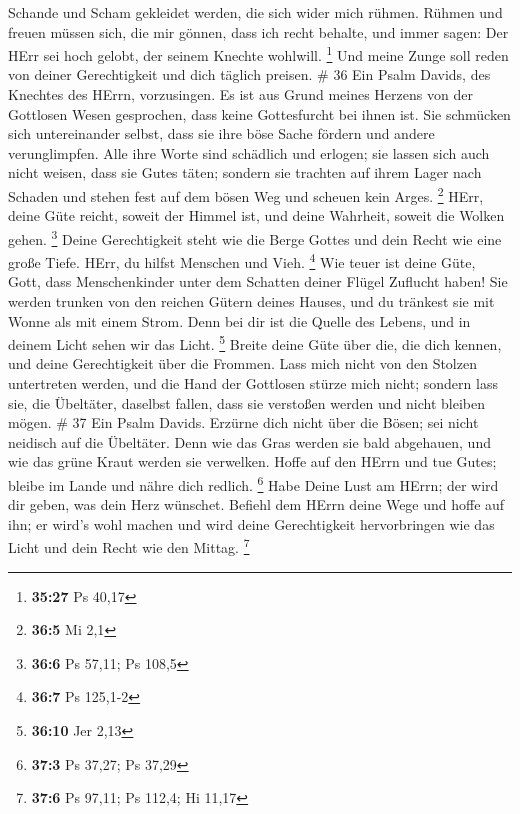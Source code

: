 Schande und Scham gekleidet werden, die sich wider mich rühmen.
 Rühmen und freuen müssen sich, die mir gönnen, dass ich
recht behalte, und immer sagen: Der HErr sei hoch gelobt, der seinem
Knechte wohlwill. \footnote{\textbf{35:27} Ps 40,17}  Und
meine Zunge soll reden von deiner Gerechtigkeit und dich täglich
preisen. \# 36  Ein Psalm Davids, des Knechtes des HErrn,
vorzusingen.  Es ist aus Grund meines Herzens von der
Gottlosen Wesen gesprochen, dass keine Gottesfurcht bei ihnen ist.
 Sie schmücken sich untereinander selbst, dass sie ihre böse
Sache fördern und andere verunglimpfen.  Alle ihre Worte
sind schädlich und erlogen; sie lassen sich auch nicht weisen, dass sie
Gutes täten;  sondern sie trachten auf ihrem Lager nach
Schaden und stehen fest auf dem bösen Weg und scheuen kein Arges.
\footnote{\textbf{36:5} Mi 2,1}  HErr, deine Güte reicht,
soweit der Himmel ist, und deine Wahrheit, soweit die Wolken gehen.
\footnote{\textbf{36:6} Ps 57,11; Ps 108,5}  Deine
Gerechtigkeit steht wie die Berge Gottes und dein Recht wie eine große
Tiefe. HErr, du hilfst Menschen und Vieh. \footnote{\textbf{36:7} Ps
  125,1-2}  Wie teuer ist deine Güte, Gott, dass
Menschenkinder unter dem Schatten deiner Flügel Zuflucht haben!
 Sie werden trunken von den reichen Gütern deines Hauses,
und du tränkest sie mit Wonne als mit einem Strom.  Denn
bei dir ist die Quelle des Lebens, und in deinem Licht sehen wir das
Licht. \footnote{\textbf{36:10} Jer 2,13}  Breite deine
Güte über die, die dich kennen, und deine Gerechtigkeit über die
Frommen.  Lass mich nicht von den Stolzen untertreten
werden, und die Hand der Gottlosen stürze mich nicht; 
sondern lass sie, die Übeltäter, daselbst fallen, dass sie verstoßen
werden und nicht bleiben mögen. \# 37  Ein Psalm Davids.
Erzürne dich nicht über die Bösen; sei nicht neidisch auf die Übeltäter.
 Denn wie das Gras werden sie bald abgehauen, und wie das
grüne Kraut werden sie verwelken.  Hoffe auf den HErrn und
tue Gutes; bleibe im Lande und nähre dich redlich. \footnote{\textbf{37:3}
  Ps 37,27; Ps 37,29}  Habe Deine Lust am HErrn; der wird
dir geben, was dein Herz wünschet.  Befiehl dem HErrn deine
Wege und hoffe auf ihn; er wird's wohl machen  und wird
deine Gerechtigkeit hervorbringen wie das Licht und dein Recht wie den
Mittag. \footnote{\textbf{37:6} Ps 97,11; Ps 112,4; Hi 11,17}
